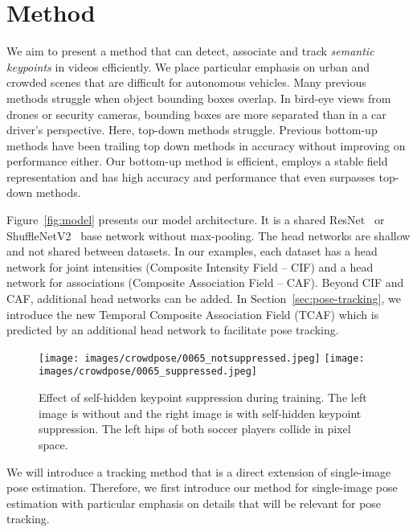 \documentclass[journal]{IEEEtran}
\begin{document}
\section{Method}

We aim to present a method that can detect, associate and track \textit{semantic keypoints} in videos efficiently.
We place particular emphasis on urban and crowded scenes that are
difficult for autonomous vehicles.
Many previous methods struggle when object bounding boxes overlap.
In bird-eye views from drones or security cameras, bounding boxes are more
separated than in a car driver's perspective. Here, top-down methods struggle.
Previous bottom-up methods have been trailing top down methods in accuracy
without improving on performance either. Our bottom-up method is efficient,
employs a stable field representation and has high accuracy and
performance that even surpasses top-down methods.

Figure~\ref{fig:model} presents our model architecture. It is a shared
ResNet~\cite{he2016deep} or ShuffleNetV2~\cite{ma2018shufflenet} base
network without max-pooling.
The head networks are shallow and not shared between datasets.
In our examples, each dataset has a head network for joint intensities
(Composite Intensity Field -- CIF) and a head network for associations
(Composite Association Field -- CAF). Beyond CIF and CAF, additional head
networks can be added. In Section~\ref{sec:pose-tracking}, we
introduce the new Temporal Composite Association Field (TCAF) which is
predicted by an additional head network to facilitate pose tracking.



\begin{figure}
  \centering
\texttt{[image: images/crowdpose/0065\_notsuppressed.jpeg]}
    \texttt{[image: images/crowdpose/0065\_suppressed.jpeg]}
\caption{
Effect of self-hidden keypoint suppression
    during training. The left image is without and the right image is with self-hidden keypoint suppression.
    The left hips of both soccer players collide in pixel space.
}
  \label{fig:self-hidden-kp-suppression}
\end{figure}

We will introduce a tracking method that is a direct extension of single-image pose estimation. Therefore, we first
introduce our method for single-image pose estimation with
particular emphasis on details that will be relevant for pose
tracking.
\end{document}
